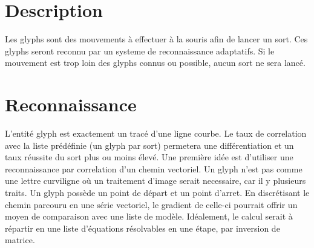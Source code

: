 \section{Description}
Les glyphs sont des mouvements à effectuer à la souris afin de lancer un sort. Ces glyphs seront reconnu par un systeme de reconnaissance adaptatifs.
Si le mouvement est trop loin des glyphs connus ou possible, aucun sort ne sera lancé.
\section{Reconnaissance}
L'entité glyph est exactement un tracé d'une ligne courbe. Le taux de correlation avec la liste prédéfinie (un glyph par sort) permetera une différentiation et un taux réussite du sort plus ou moins élevé.
Une première idée est d'utiliser une reconnaissance par correlation d'un chemin vectoriel. Un glyph n'est pas comme une lettre curviligne où un traitement d'image serait necessaire, car il y plusieurs traits. Un glyph possède un point de départ et un point d'arret. En discrétisant le chemin parcouru en une série vectoriel, le gradient de celle-ci pourrait offrir un moyen de comparaison avec une liste de modèle.
Idéalement, le calcul serait à répartir en une liste d'équations résolvables en une étape, par inversion de matrice.